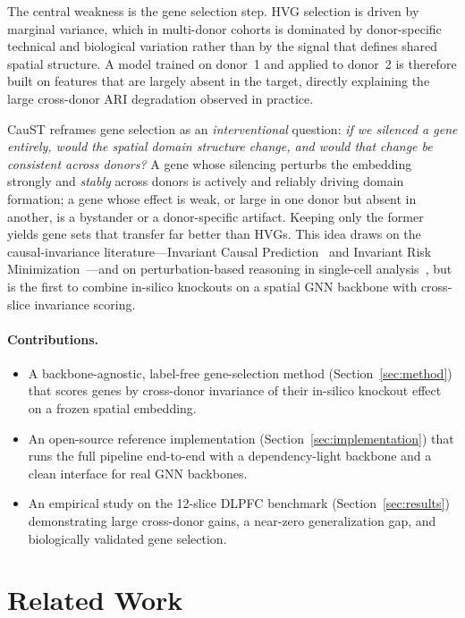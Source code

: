 \documentclass[11pt]{article}
\begin{document}
The central weakness is the gene selection step. HVG selection is driven by
marginal variance, which in multi-donor cohorts is dominated by donor-specific
technical and biological variation rather than by the signal that defines shared
spatial structure. A model trained on donor~1 and applied to donor~2 is
therefore built on features that are largely absent in the target, directly
explaining the large cross-donor ARI degradation observed in practice.

CauST reframes gene selection as an \emph{interventional} question: \emph{if we
silenced a gene entirely, would the spatial domain structure change, and would
that change be consistent across donors?} A gene whose silencing perturbs the
embedding strongly and \emph{stably} across donors is actively and reliably
driving domain formation; a gene whose effect is weak, or large in one donor but
absent in another, is a bystander or a donor-specific artifact. Keeping only the
former yields gene sets that transfer far better than HVGs. This idea draws on
the causal-invariance literature---Invariant Causal Prediction~\citep{peters2016}
and Invariant Risk Minimization~\citep{arjovsky2019}---and on perturbation-based
reasoning in single-cell analysis~\citep{dixit2016,lotfollahi2019}, but is the first to
combine in-silico knockouts on a spatial GNN backbone with cross-slice
invariance scoring.

\paragraph{Contributions.}
\begin{itemize}
\item A backbone-agnostic, label-free gene-selection method
(Section~\ref{sec:method}) that scores genes by cross-donor invariance of their
in-silico knockout effect on a frozen spatial embedding.
\item An open-source reference implementation
(Section~\ref{sec:implementation}) that runs the full pipeline end-to-end with a
dependency-light backbone and a clean interface for real GNN backbones.
\item An empirical study on the 12-slice DLPFC benchmark
(Section~\ref{sec:results}) demonstrating large cross-donor gains, a near-zero
generalization gap, and biologically validated gene selection.
\end{itemize}

\section{Related Work}
\label{sec:related}
\end{document}

